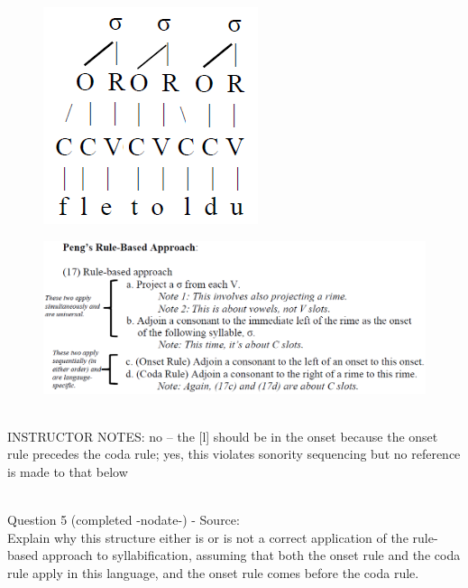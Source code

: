 \documentclass[12pt]{article}
\begin{document}
\begin{figure}[H]
\includegraphics{../images/pengrules_fletoldu_no.png}
\end{figure}
\begin{figure}[H]
\includegraphics{../images/peng_rules.png}
\end{figure}

~\\
INSTRUCTOR NOTES: no -- the [l] should be in the onset because the onset rule precedes the coda rule; yes, this violates sonority sequencing but no reference is made to that below


~\\

{\large Question 5} (completed -nodate-) - Source: \\

Explain why this structure either is or is not a correct application of the rule-based approach to syllabification, assuming that both the onset rule and the coda rule apply in this language, and the onset rule comes before the coda rule.\\
\end{document}

